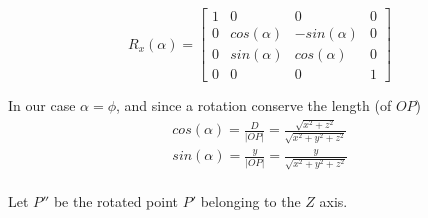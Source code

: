 \documentclass[a4paper,10pt]{article}
\begin{document}
\begin{equation}
R_x(\alpha) =
\begin{bmatrix}
	1  & 0 			& 0 		   & 0 \\
	0 & cos(\alpha) & -sin(\alpha) & 0 \\
	0 & sin(\alpha) & cos(\alpha)  & 0 \\
	0 & 0 			& 0 		   & 1
\end{bmatrix}
\end{equation}

\noindent
In our case $\alpha = \phi$, and since a rotation conserve the length (of $OP$)
\begin{equation}
\left.\begin{aligned}
&cos(\alpha) = \frac{D}{|OP|} = \frac{\sqrt{x^2 + z^2}}{\sqrt{x^2 + y^2 + z^2}}&\\
&sin(\alpha) = \frac{y}{|OP|} = \frac{y}{\sqrt{x^2 + y^2 + z^2}}&\\
\end{aligned}\right.
\end{equation}

\bigskip \noindent
Let $P''$ be the rotated point $P'$ belonging to the $Z$ axis.
\end{document}
